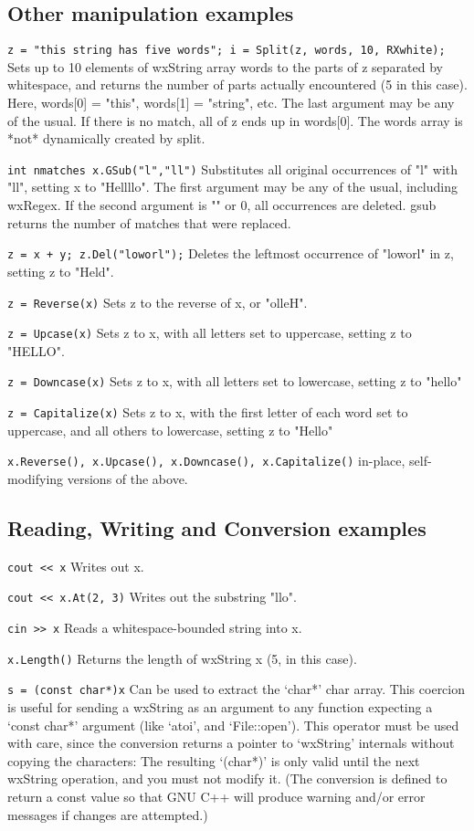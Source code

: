 \subsection{Other manipulation examples}

{\tt z = "this string has five words"; i = Split(z, words, 10, RXwhite);} 
Sets up to 10 elements of wxString array words to the parts of z
separated by whitespace, and returns the number of parts actually
encountered (5 in this case). Here, words[0] = "this", words[1] =
"string", etc.  The last argument may be any of the usual.  If
there is no match, all of z ends up in words[0]. The words array
is *not* dynamically created by split.

{\tt int nmatches x.GSub("l","ll")} 
Substitutes all original occurrences of "l" with "ll", setting x
to "Hellllo". The first argument may be any of the usual,
including wxRegex.  If the second argument is "" or 0, all
occurrences are deleted. gsub returns the number of matches that
were replaced.

{\tt z = x + y;  z.Del("loworl");} 
Deletes the leftmost occurrence of "loworl" in z, setting z to
"Held".

{\tt z = Reverse(x)} 
Sets z to the reverse of x, or "olleH".

{\tt z = Upcase(x)} 
Sets z to x, with all letters set to uppercase, setting z to
"HELLO".

{\tt z = Downcase(x)} 
Sets z to x, with all letters set to lowercase, setting z to
"hello"

{\tt z = Capitalize(x)} 
Sets z to x, with the first letter of each word set to uppercase,
and all others to lowercase, setting z to "Hello"

{\tt x.Reverse(), x.Upcase(), x.Downcase(), x.Capitalize()} 
in-place, self-modifying versions of the above.

\subsection{Reading, Writing and Conversion examples}

{\tt cout << x} 
Writes out x.

{\tt cout << x.At(2, 3)} 
Writes out the substring "llo".

{\tt cin >> x} 
Reads a whitespace-bounded string into x.

{\tt x.Length()} 
Returns the length of wxString x (5, in this case).

{\tt s = (const char*)x} 
Can be used to extract the `char*' char array. This coercion is
useful for sending a wxString as an argument to any function
expecting a `const char*' argument (like `atoi', and
`File::open'). This operator must be used with care, since the
conversion returns a pointer to `wxString' internals without copying
the characters: The resulting `(char*)' is only valid until the
next wxString operation,  and you must not modify it.  (The
conversion is defined to return a const value so that GNU C++ will
produce warning and/or error messages if changes are attempted.)



